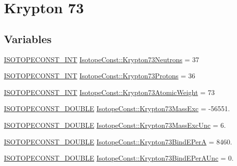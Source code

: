 \hypertarget{group___isotope_const-_krypton-_kr73}{}\section{Krypton 73}
\label{group___isotope_const-_krypton-_kr73}
\subsection*{Variables}
\begin{DoxyCompactItemize}
\item 
\mbox{\hyperlink{group___isotope_const-_macros_ga5f18360b3e99483a35c32d789e62621c}{I\+S\+O\+T\+O\+P\+E\+C\+O\+N\+S\+T\+\_\+\+I\+NT}} \mbox{\hyperlink{group___isotope_const-_krypton-_kr73_ga6b14f6201e6fb1e7e554943918decb96}{Isotope\+Const\+::\+Krypton73\+Neutrons}} = 37
\item 
\mbox{\hyperlink{group___isotope_const-_macros_ga5f18360b3e99483a35c32d789e62621c}{I\+S\+O\+T\+O\+P\+E\+C\+O\+N\+S\+T\+\_\+\+I\+NT}} \mbox{\hyperlink{group___isotope_const-_krypton-_kr73_ga07c4ca76f2073e74b6b08bdc3ed93ab3}{Isotope\+Const\+::\+Krypton73\+Protons}} = 36
\item 
\mbox{\hyperlink{group___isotope_const-_macros_ga5f18360b3e99483a35c32d789e62621c}{I\+S\+O\+T\+O\+P\+E\+C\+O\+N\+S\+T\+\_\+\+I\+NT}} \mbox{\hyperlink{group___isotope_const-_krypton-_kr73_ga656dfd92f2ff773ea1d528d69eb1ca31}{Isotope\+Const\+::\+Krypton73\+Atomic\+Weight}} = 73
\item 
\mbox{\hyperlink{group___isotope_const-_macros_ga8f45a7272ce02c0b4c65c44636ed719a}{I\+S\+O\+T\+O\+P\+E\+C\+O\+N\+S\+T\+\_\+\+D\+O\+U\+B\+LE}} \mbox{\hyperlink{group___isotope_const-_krypton-_kr73_gadf7b6d43e76cb4b4fc0c70bc47bf0ac9}{Isotope\+Const\+::\+Krypton73\+Mass\+Exc}} = -\/56551.
\item 
\mbox{\hyperlink{group___isotope_const-_macros_ga8f45a7272ce02c0b4c65c44636ed719a}{I\+S\+O\+T\+O\+P\+E\+C\+O\+N\+S\+T\+\_\+\+D\+O\+U\+B\+LE}} \mbox{\hyperlink{group___isotope_const-_krypton-_kr73_ga2531b1dcdcf1b0fe9c0c6c3131cea79e}{Isotope\+Const\+::\+Krypton73\+Mass\+Exc\+Unc}} = 6.
\item 
\mbox{\hyperlink{group___isotope_const-_macros_ga8f45a7272ce02c0b4c65c44636ed719a}{I\+S\+O\+T\+O\+P\+E\+C\+O\+N\+S\+T\+\_\+\+D\+O\+U\+B\+LE}} \mbox{\hyperlink{group___isotope_const-_krypton-_kr73_ga10dc164750d25e8db6188ca1d7dc9075}{Isotope\+Const\+::\+Krypton73\+Bind\+E\+PerA}} = 8460.
\item 
\mbox{\hyperlink{group___isotope_const-_macros_ga8f45a7272ce02c0b4c65c44636ed719a}{I\+S\+O\+T\+O\+P\+E\+C\+O\+N\+S\+T\+\_\+\+D\+O\+U\+B\+LE}} \mbox{\hyperlink{group___isotope_const-_krypton-_kr73_gab14e4f8644dc72e3775c2dc6da355e86}{Isotope\+Const\+::\+Krypton73\+Bind\+E\+Per\+A\+Unc}} = 0.

\end{DoxyCompactItemize}
